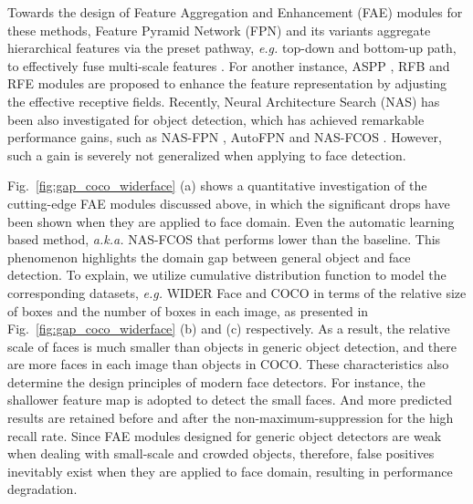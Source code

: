 \documentclass[sigconf]{acmart}
\begin{document}
Towards the design of Feature Aggregation and Enhancement (FAE) modules for these methods, Feature Pyramid Network (FPN) and its variants aggregate hierarchical features via the preset pathway, \textit{e.g.} top-down and bottom-up path, to effectively fuse multi-scale features \cite{tang2018pyramidbox,tan2020efficientdet,liu2018pafpn,li2019dsfd,zhang2020acfd}. For another instance, ASPP \cite{chen2017aspp,qiao2020detectors}, RFB \cite{liu2018rfb} and RFE \cite{deng2019retinaface} modules are proposed to enhance the feature representation by adjusting the effective receptive fields. Recently, Neural Architecture Search (NAS) has been also investigated for object detection, which has achieved remarkable performance gains, such as NAS-FPN \cite{ghiasi2019nasfpn}, AutoFPN \cite{xu2019autofpn} and NAS-FCOS \cite{wang2019nasfcos}. However, such a gain is severely not generalized when applying to face detection.

Fig.~\ref{fig:gap_coco_widerface} (a) shows a quantitative investigation of the cutting-edge FAE modules discussed above, in which the significant drops have been shown when they are applied to face domain. Even the automatic learning based method, \textit{a.k.a.} NAS-FCOS \cite{wang2019nasfcos} that performs  lower than the baseline. This phenomenon highlights the domain gap between general object and face detection. To explain, we utilize cumulative distribution function to model the corresponding datasets, \textit{e.g.} WIDER Face \cite{yang2016wider} and COCO \cite{lin2014coco} in terms of the relative size of boxes and the number of boxes in each image, as presented in Fig.~\ref{fig:gap_coco_widerface} (b) and (c) respectively. As a result, the relative scale of faces is much smaller than objects in generic object detection, and there are more faces in each image than objects in COCO.
These characteristics also determine the design principles of modern face detectors. For instance, the shallower feature map is adopted to detect the small faces. And more predicted results are retained before and after the non-maximum-suppression for the high recall rate. Since FAE modules designed for generic object detectors are weak when dealing with small-scale and crowded objects, therefore, false positives inevitably exist when they are applied to face domain, resulting in performance degradation.
\end{document}
